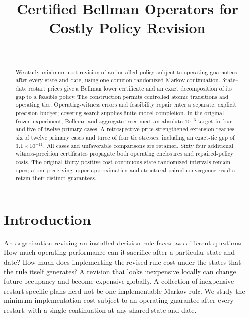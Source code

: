 

\begin{frontmatter}
\title{Certified Bellman Operators for Costly Policy Revision}
\begin{aug}\author[id=au1,addressref={add1}]{~}\address[id=add1]{}\end{aug}
\begin{abstract}
We study minimum-cost revision of an installed policy subject to operating guarantees after every state and date, using one common randomized Markov continuation. State--date restart prices give a Bellman lower certificate and an exact decomposition of its gap to a feasible policy. The construction permits controlled atomic transitions and operating ties. Operating-witness errors and feasibility repair enter a separate, explicit precision budget; covering search supplies finite-model completion. In the original frozen experiment, Bellman and aggregate trees meet an absolute $10^{-3}$ target in four and five of twelve primary cases. A retrospective price-strengthened extension reaches six of twelve primary cases and three of four tie stresses, including an exact-tie gap of $3.1\times10^{-11}$. All cases and unfavorable comparisons are retained. Sixty-four additional witness-precision certificates propagate both operating enclosures and repaired-policy costs. The original thirty positive-cost continuous-state randomized intervals remain open; atom-preserving upper approximation and structural paired-convergence results retain their distinct guarantees.
\end{abstract}
\begin{keyword}\end{keyword}
\end{frontmatter}

\section{Introduction}\label{sec:intro45}
An organization revising an installed decision rule faces two different questions. How much operating performance can it sacrifice after a particular state and date? How much does implementing the revised rule cost under the states that the rule itself generates? A revision that looks inexpensive locally can change future occupancy and become expensive globally. A collection of inexpensive restart-specific plans need not be one implementable Markov rule. We study the minimum implementation cost subject to an operating guarantee after every restart, with a single continuation at any shared state and date.

